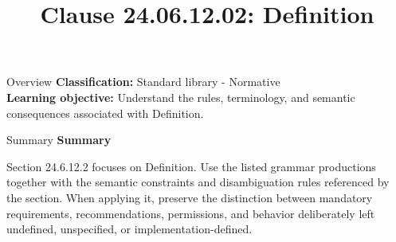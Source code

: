 \documentclass[10pt,letterpaper]{article}
\title{Clause 24.06.12.02: Definition}
\author{}
\date{}
\begin{document}
\maketitle
\begin{CornellOverviewBox}{Overview}
\textbf{Classification:} Standard library - Normative\\[2pt]
\textbf{Learning objective:} Understand the rules, terminology, and semantic consequences associated with Definition.
\end{CornellOverviewBox}\begin{CornellSummaryBox}{Summary}
{\sffamily\bfseries\color{Accent} Summary}\par\vspace{3pt}Section 24.6.12.2 focuses on Definition. Use the listed grammar productions together with the semantic constraints and disambiguation rules referenced by the section. When applying it, preserve the distinction between mandatory requirements, recommendations, permissions, and behavior deliberately left undefined, unspecified, or implementation-defined.
\end{CornellSummaryBox}
\end{document}
